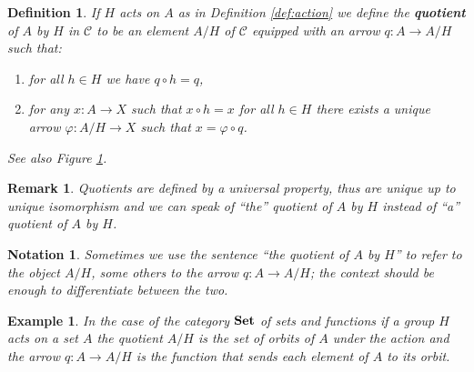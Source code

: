 \documentclass[italian, 12pt, reqno]{article}
\theoremstyle{myteo}
\newtheorem{definition}[theorem]{Definition}
\newtheorem{example}[theorem]{Example}
\newtheorem{remark}[theorem]{Remark}
\newtheorem{notation}[theorem]{Notation}
\numberwithin{equation}{section}
\newcommand{\cat}[1]{\mathscr{#1}}
\newcommand{\set}{\text{\textbf{Set}}}
\newcommand{\fun}[3]{#1\colon#2\to #3}
\begin{document}
\begin{definition}
  \label{def:quotient}
  If \(H\) acts on \(A\) as in Definition \ref{def:action} we define the \textbf{quotient} of \(A\) by \(H\) in \(\cat{C}\) to be an element \(A/H\) of \(\cat{C}\) equipped with an arrow \(\fun{q}{A}{A/H}\) such that:
  \begin{enumerate}
  \item for all \(h\in H\) we have \(q\circ h = q\),
  \item for any \(\fun{x}{A}{X}\) such that \(x\circ h = x\) for all \(h\in H\) there exists a unique arrow \(\fun{\varphi}{A/H}{X}\) such that \(x = \varphi\circ q\).
  \end{enumerate}
  See also Figure \ref{diagram:quotient}.
\end{definition}

\begin{remark}
  \label{rem:uniqueness_of_quotient}
  Quotients are defined by a universal property, thus are unique up to unique isomorphism and we can speak of ``the'' quotient of \(A\) by \(H\) instead of ``a'' quotient of \(A\) by \(H\).
\end{remark}

\begin{notation}
  \label{not:quotient}
  Sometimes we use the sentence ``the quotient of \(A\) by \(H\)'' to refer to the object \(A/H\), some others to the arrow \(\fun{q}{A}{A/H}\); the context should be enough to differentiate between the two.
\end{notation}

\begin{figure}[h]
  \begin{center}
  \end{center}
  \caption{}
  \label{diagram:quotient}
\end{figure}

\begin{example}
  \label{ex:orbits}
  In the case of the category \(\set\) of sets and functions if a group \(H\) acts on a set \(A\) the quotient \(A/H\) is the set of orbits of \(A\) under the action and the arrow \(q: A \to A/H\) is the function that sends each element of \(A\) to its orbit.
\end{example}
\end{document}
